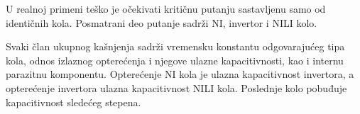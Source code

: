 U realnoj primeni teško je očekivati kritičnu putanju sastavljenu samo od identičnih kola. Posmatrani deo putanje sadrži NI, invertor i NILI kolo.

Svaki član ukupnog kašnjenja sadrži vremensku konstantu odgovarajućeg tipa kola, odnos izlaznog opterećenja i njegove ulazne kapacitivnosti, kao i internu parazitnu komponentu. Opterećenje NI kola je ulazna kapacitivnost invertora, a opterećenje invertora ulazna kapacitivnost NILI kola. Poslednje kolo pobuđuje kapacitivnost sledećeg stepena.
